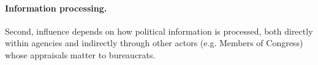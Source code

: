 \paragraph{Information processing.} Second, influence depends on how political information is processed, both directly within agencies and indirectly through other actors (e.g. Members of Congress) whose appraisals matter to bureaucrats.





